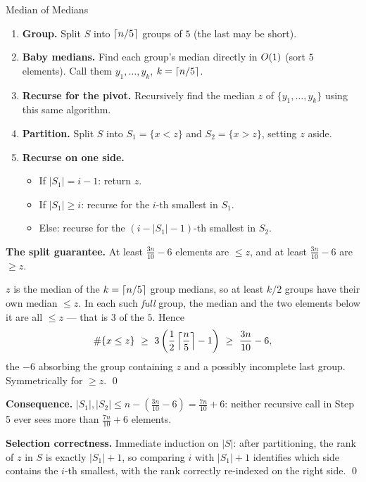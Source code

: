 \begin{algo}{Median of Medians}
\begin{enumerate}
  \item \textbf{Group.} Split $S$ into $\left\lceil n/5 \right\rceil$ groups of $5$ (the last may be short).
  \item \textbf{Baby medians.} Find each group's median directly in $O(1)$ (sort $5$ elements).
        Call them $y_1,\dots,y_k$, $k=\left\lceil n/5 \right\rceil$.
  \item \textbf{Recurse for the pivot.} Recursively find the median $z$ of $\{y_1,\dots,y_k\}$
        using this same algorithm.
  \item \textbf{Partition.} Split $S$ into $S_1=\{x<z\}$ and $S_2=\{x>z\}$, setting $z$ aside.
  \item \textbf{Recurse on one side.}
        \begin{itemize}
          \item If $|S_1|=i-1$: return $z$.
          \item If $|S_1|\ge i$: recurse for the $i$-th smallest in $S_1$.
          \item Else: recurse for the $(i-|S_1|-1)$-th smallest in $S_2$.
        \end{itemize}
\end{enumerate}
\end{algo}

\begin{correct}
\textbf{The split guarantee.} At least $\tfrac{3n}{10}-6$ elements are $\le z$, and at least
$\tfrac{3n}{10}-6$ are $\ge z$.

\prf $z$ is the median of the $k=\left\lceil n/5 \right\rceil$ group medians, so at least $k/2$ groups have their
own median $\le z$. In each such \emph{full} group, the median and the two elements below it are
all $\le z$ --- that is $3$ of the $5$. Hence
\[
  \#\{x\le z\}\ \ge\ 3\left(\frac12\ceil{\frac n5}-1\right)\ \ge\ \frac{3n}{10}-6,
\]
the $-6$ absorbing the group containing $z$ and a possibly incomplete last group. Symmetrically
for $\ge z$. \qed

\textbf{Consequence.} $|S_1|,|S_2|\le n-\left(\tfrac{3n}{10}-6\right)=\tfrac{7n}{10}+6$: neither
recursive call in Step 5 ever sees more than $\tfrac{7n}{10}+6$ elements.

\textbf{Selection correctness.} Immediate induction on $|S|$: after partitioning, the rank of $z$
in $S$ is exactly $|S_1|+1$, so comparing $i$ with $|S_1|+1$ identifies which side contains the
$i$-th smallest, with the rank correctly re-indexed on the right side. \qed
\end{correct}

